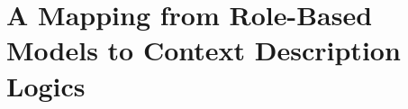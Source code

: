 
\chapter{A Mapping from Role-Based Models to Context Description Logics}
\label{cha:mapping}







